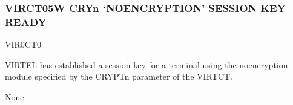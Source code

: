 \documentclass[letterpaper,10pt,english]{sphinxmanual}
\begin{document}
\subsubsection{VIRCT05W CRYn ‘NO\sphinxhyphen{}ENCRYPTION’ SESSION KEY READY}
\label{\detokenize{messages:virct05w-cryn-no-encryption-session-key-ready}}\begin{description}
\sphinxAtStartPar
VIR0CT0

\sphinxAtStartPar
VIRTEL has established a session key for a terminal using the no\sphinxhyphen{}encryption module specified by the CRYPTn parameter of the VIRTCT.

\sphinxAtStartPar
None.

\end{description}
\end{document}
